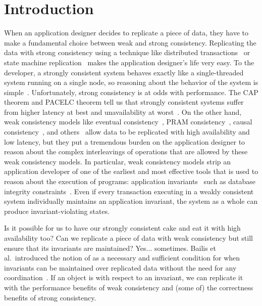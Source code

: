 \section{Introduction}
When an application designer decides to replicate a piece of data, they have to
make a fundamental choice between weak and strong consistency. Replicating the
data with strong consistency using a technique like distributed
transactions~\cite{bernstein1981concurrency,mohan1986transaction} or state
machine replication~\cite{schneider1990implementing, lamport1998part,
liskov2012viewstamped, ongaro2014search} makes the application designer's life
very easy. To the developer, a strongly consistent system behaves exactly like
a single-threaded system running on a single node, so reasoning about the
behavior of the system is simple~\cite{herlihy1990linearizability}.
Unfortunately, strong consistency is at odds with performance. The CAP theorem
and PACELC theorem tell us that strongly consistent systems suffer from higher
latency at best and unavailability at worst~\cite{gilbert2002brewer,
brewer2012cap, abadi2012consistency}. On the other hand, weak consistency
models like eventual consistency~\cite{vogels2009eventually}, PRAM
consistency~\cite{lipton1988pram}, causal consistency~\cite{ahamad1995causal},
and others~\cite{lloyd2011don, mehdi2017can} allow data to be replicated with
high availability and low latency, but they put a tremendous burden on the
application designer to reason about the complex interleavings of operations
that are allowed by these weak consistency models. In particular, weak
consistency models strip an application developer of one of the earliest and
most effective tools that is used to reason about the execution of programs:
application invariants~\cite{hoare1969axiomatic, balegas2015towards} such as
database integrity constraints~\cite{grefen1993integrity, gupta1993local}. Even
if every transaction executing in a weakly consistent system individually
maintains an application invariant, the system as a whole can produce
invariant-violating states.

Is it possible for us to have our strongly consistent cake and eat it with high
availability too? Can we replicate a piece of data with weak consistency but
still ensure that its invariants are maintained? Yes... sometimes. Bailis et
al.\ introduced the notion of \emph{\invariantconfluence{}} as a necessary and
sufficient condition for when invariants can be maintained over replicated data
without the need for any coordination~\cite{bailis2014coordination}. If an
object is \invariantconfluent{} with respect to an invariant, we can replicate
it with the performance benefits of weak consistency and (some of) the
correctness benefits of strong consistency.

